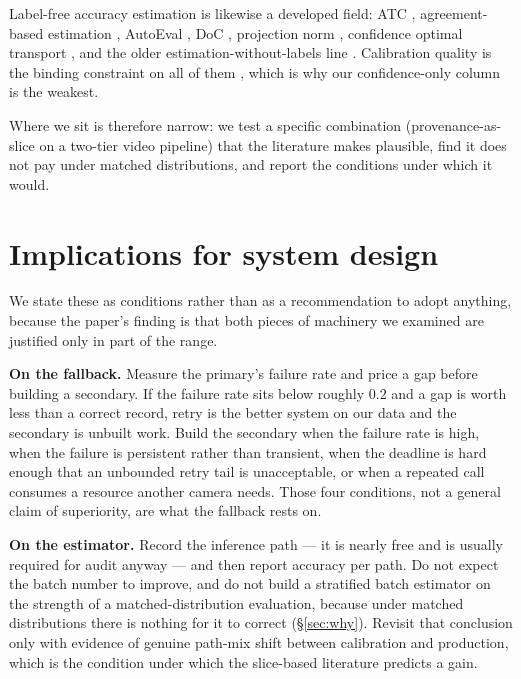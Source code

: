 \documentclass[11pt,a4paper]{article}
\begin{document}
Label-free accuracy estimation is likewise a developed field: ATC
\citep{garg2022atc}, agreement-based estimation \citep{baek2022agreement},
AutoEval \citep{deng2021autoeval}, DoC \citep{guillory2021doc}, projection norm
\citep{yu2022projnorm}, confidence optimal transport \citep{lu2023cot}, and the
older estimation-without-labels line \citep{platanios2014estimating}. Calibration
quality is the binding constraint on all of them \citep{guo2017calibration,
ovadia2019trust}, which is why our confidence-only column is the weakest.

Where we sit is therefore narrow: we test a specific combination
(provenance-as-slice on a two-tier video pipeline) that the literature makes
plausible, find it does not pay under matched distributions, and report the
conditions under which it would.

\section{Implications for system design}
\label{sec:design}

We state these as conditions rather than as a recommendation to adopt anything,
because the paper's finding is that both pieces of machinery we examined are
justified only in part of the range.

\textbf{On the fallback.} Measure the primary's failure rate and price a gap
before building a secondary. If the failure rate sits below roughly $0.2$ and a
gap is worth less than a correct record, retry is the better system on our data
and the secondary is unbuilt work. Build the secondary when the failure rate is
high, when the failure is persistent rather than transient, when the deadline is
hard enough that an unbounded retry tail is unacceptable, or when a repeated call
consumes a resource another camera needs. Those four conditions, not a general
claim of superiority, are what the fallback rests on.

\textbf{On the estimator.} Record the inference path --- it is nearly free and is
usually required for audit anyway --- and then report accuracy per path. Do not
expect the batch number to improve, and do not build a stratified batch estimator
on the strength of a matched-distribution evaluation, because under matched
distributions there is nothing for it to correct (\S\ref{sec:why}). Revisit that
conclusion only with evidence of genuine path-mix shift between calibration and
production, which is the condition under which the slice-based literature predicts
a gain.
\end{document}

